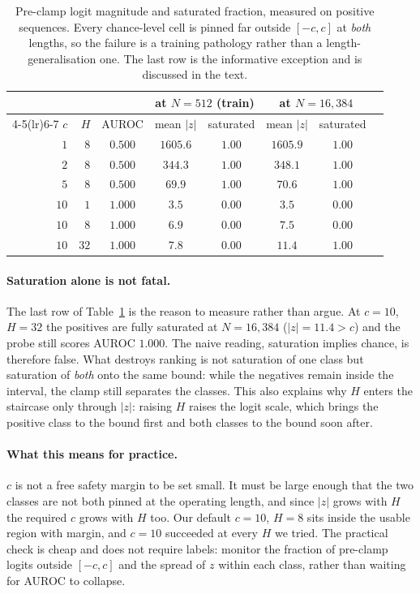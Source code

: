 \documentclass[10pt]{article}
\theoremstyle{plain}
\theoremstyle{definition}
\theoremstyle{remark}
\begin{document}
\begin{table}[!ht]
\centering\small
\begin{tabular}{rrcccccc}
\toprule
& & & \multicolumn{2}{c}{at $N{=}512$ (train)} & \multicolumn{2}{c}{at $N{=}16{,}384$}\\
\cmidrule(lr){4-5}\cmidrule(lr){6-7}
$c$ & $H$ & AUROC & mean $|z|$ & saturated & mean $|z|$ & saturated\\
\midrule
$1$  & $8$  & $0.500$ & $1605.6$ & $1.00$ & $1605.9$ & $1.00$\\
$2$  & $8$  & $0.500$ & $344.3$  & $1.00$ & $348.1$  & $1.00$\\
$5$  & $8$  & $0.500$ & $69.9$   & $1.00$ & $70.6$   & $1.00$\\
$10$ & $1$  & $1.000$ & $3.5$    & $0.00$ & $3.5$    & $0.00$\\
$10$ & $8$  & $1.000$ & $6.9$    & $0.00$ & $7.5$    & $0.00$\\
$10$ & $32$ & $1.000$ & $7.8$    & $0.00$ & $11.4$   & $1.00$\\
\bottomrule
\end{tabular}
\caption{Pre-clamp logit magnitude and saturated fraction, measured on positive
sequences. Every chance-level cell is pinned far outside $[-c,c]$ at \emph{both} lengths,
so the failure is a training pathology rather than a length-generalisation one. The last
row is the informative exception and is discussed in the text.}
\label{tab:saturation}
\end{table}

\paragraph{Saturation alone is not fatal.} The last row of Table~\ref{tab:saturation} is
the reason to measure rather than argue. At $c{=}10$, $H{=}32$ the positives are fully
saturated at $N{=}16{,}384$ ($|z|=11.4>c$) and the probe still scores AUROC $1.000$. The
naive reading, saturation implies chance, is therefore false. What destroys ranking is not
saturation of one class but saturation of \emph{both} onto the same bound: while the
negatives remain inside the interval, the clamp still separates the classes. This also
explains why $H$ enters the staircase only through $|z|$: raising $H$ raises the logit
scale, which brings the positive class to the bound first and both classes to the bound
soon after.

\paragraph{What this means for practice.} $c$ is not a free safety margin to be set small.
It must be large enough that the two classes are not both pinned at the operating length,
and since $|z|$ grows with $H$ the required $c$ grows with $H$ too. Our default $c{=}10$,
$H{=}8$ sits inside the usable region with margin, and $c{=}10$ succeeded at every $H$ we
tried. The practical check is cheap and does not require labels: monitor the fraction of
pre-clamp logits outside $[-c,c]$ and the spread of $z$ within each class, rather than
waiting for AUROC to collapse.
\end{document}
